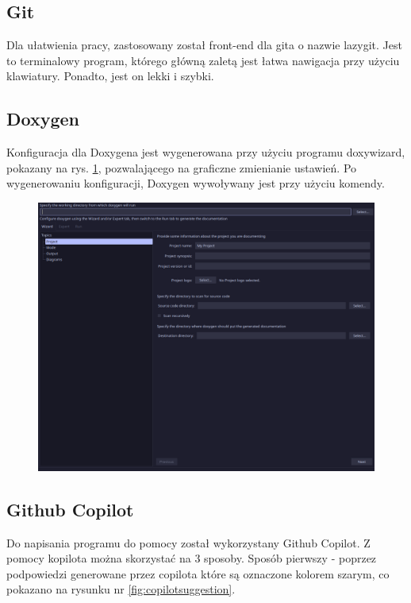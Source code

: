\subsection{Git}

Dla ułatwienia pracy, zastosowany został front-end dla gita o nazwie lazygit. Jest to terminalowy program, którego główną zaletą jest łatwa nawigacja przy użyciu klawiatury. Ponadto, jest on lekki i szybki.

\subsection{Doxygen}

Konfiguracja dla Doxygena jest wygenerowana przy użyciu programu doxywizard, pokazany na rys. \ref{fig:doxywizard}, pozwalającego na graficzne zmienianie ustawień. Po wygenerowaniu konfiguracji, Doxygen wywoływany jest przy użyciu komendy.

\begin{figure}[H]
	\centering
	\includegraphics[width=1\textwidth]{images/doxywizard.png}
	\caption{}
	\label{fig:doxywizard}
\end{figure}

\subsection{Github Copilot}
Do napisania programu do pomocy został wykorzystany Github Copilot. Z pomocy kopilota można skorzystać na 3 sposoby. Sposób pierwszy - poprzez podpowiedzi generowane przez copilota które są oznaczone kolorem szarym, co pokazano na rysunku nr \ref{fig:copilotsuggestion}.

